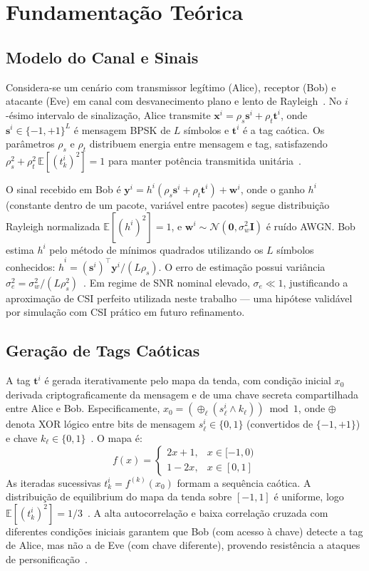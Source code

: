 \documentclass{sbrt}
\begin{document}
\section{Fundamentação Teórica}

\subsection{Modelo do Canal e Sinais}

Considera-se um cenário com transmissor legítimo (Alice), receptor (Bob) e atacante (Eve) em canal com desvanecimento plano e lento de Rayleigh~\cite{ref_poor}. No $i$-ésimo intervalo de sinalização, Alice transmite $\mathbf{x}^i = \rho_s \mathbf{s}^i + \rho_t \mathbf{t}^i$, onde $\mathbf{s}^i \in \{-1,+1\}^L$ é mensagem BPSK de $L$ símbolos e $\mathbf{t}^i$ é a tag caótica. Os parâmetros $\rho_s$ e $\rho_t$ distribuem energia entre mensagem e tag, satisfazendo $\rho_s^2 + \rho_t^2\,\mathbb{E}[(t_k^i)^2] = 1$ para manter potência transmitida unitária~\cite{ref_joao}.

O sinal recebido em Bob é $\mathbf{y}^i = h^i(\rho_s \mathbf{s}^i + \rho_t \mathbf{t}^i) + \mathbf{w}^i$, onde o ganho $h^i$ (constante dentro de um pacote, variável entre pacotes) segue distribuição Rayleigh normalizada $\mathbb{E}[(h^i)^2]=1$, e $\mathbf{w}^i \sim \mathcal{N}(\mathbf{0}, \sigma_w^2\mathbf{I})$ é ruído AWGN. Bob estima $h^i$ pelo método de mínimos quadrados utilizando os $L$ símbolos conhecidos: $\hat{h}^i = (\mathbf{s}^i)^\top \mathbf{y}^i/(L\rho_s)$. O erro de estimação possui variância $\sigma_e^2 = \sigma_w^2/(L\rho_s^2)$~\cite{ref_kay}. Em regime de SNR nominal elevado, $\sigma_e \ll 1$, justificando a aproximação de CSI perfeito utilizada neste trabalho — uma hipótese validável por simulação com CSI prático em futuro refinamento.

\subsection{Geração de Tags Caóticas}

A tag $\mathbf{t}^i$ é gerada iterativamente pelo mapa da tenda, com condição inicial $x_0$ derivada criptograficamente da mensagem e de uma chave secreta compartilhada entre Alice e Bob. Especificamente, $x_0 = (\oplus_\ell (s_\ell^i \land k_\ell)) \bmod 1$, onde $\oplus$ denota XOR lógico entre bits de mensagem $s_\ell^i \in \{0,1\}$ (convertidos de $\{-1,+1\}$) e chave $k_\ell \in \{0,1\}$~\cite{ref_joao}. O mapa é:
\begin{equation}\label{eq:tentmap}
    f(x) = \begin{cases} 2x+1, & x \in [-1,0) \\ 1-2x, & x \in [0,1] \end{cases}
\end{equation}
As iteradas sucessivas $t_k^i = f^{(k)}(x_0)$ formam a sequência caótica. A distribuição de equilibrium do mapa da tenda sobre $[-1,1]$ é uniforme, logo $\mathbb{E}[(t_k^i)^2] = 1/3$~\cite{ref_poor}. A alta autocorrelação e baixa correlação cruzada com diferentes condições iniciais garantem que Bob (com acesso à chave) detecte a tag de Alice, mas não a de Eve (com chave diferente), provendo resistência a ataques de personificação~\cite{ref_joao}.
\end{document}
